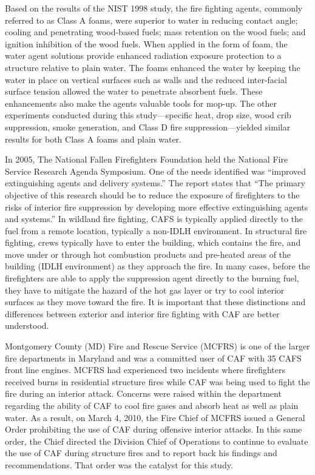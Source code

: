 \documentclass[12pt,oneside]{book}
\begin{document}
Based on the results of the NIST 1998 study, the fire fighting agents, commonly referred to as Class A foams, were superior to water in reducing contact angle; cooling and penetrating wood-based fuels; mass retention on the wood fuels; and ignition inhibition of the wood fuels.  When applied in the form of foam, the water agent solutions provide enhanced radiation exposure protection to a structure relative to plain water. The foams enhanced the water by keeping the water in place on vertical surfaces such as walls and the reduced inter-facial surface tension allowed the water to penetrate absorbent fuels. These enhancements also make the agents valuable tools for mop-up. The other experiments conducted during this study---specific heat, drop size, wood crib suppression, smoke generation, and Class D fire suppression---yielded similar results for both Class A foams and plain water.

In 2005, The National Fallen Firefighters Foundation held the National Fire Service Research Agenda Symposium.  One of the needs identified was ``improved extinguishing agents and delivery systems.'' The report states that ``The primary objective of this research should be to reduce the exposure of firefighters to the risks of interior fire suppression by developing more effective extinguishing agents and systems.'' In wildland fire fighting, CAFS is typically applied directly to the fuel from a remote location, typically a non-IDLH environment. In structural fire fighting, crews typically have to enter the building, which contains the fire, and move under or through hot combustion products and pre-heated areas of the building (IDLH environment) as they approach the fire. In many cases, before the firefighters are able to apply the suppression agent directly to the burning fuel, they have to mitigate the hazard of the hot gas layer or try to cool interior surfaces as they move toward the fire. It is important that these distinctions and differences between exterior and interior fire fighting with CAF are better understood.

Montgomery County (MD) Fire and Rescue Service (MCFRS) is one of the larger fire departments in Maryland and was a committed user of CAF with 35 CAFS front line engines. MCFRS had experienced two incidents where firefighters received burns in residential structure fires while CAF was being used to fight the fire during an interior attack. Concerns were raised within the department regarding the ability of CAF to cool fire gases and absorb heat as well as plain water. As a result, on March 4, 2010, the Fire Chief of MCFRS issued a General Order prohibiting the use of CAF during offensive interior attacks. In this same order, the Chief directed the Division Chief of Operations to continue to evaluate the use of CAF during structure fires and to report back his findings and recommendations. That order was the catalyst for this study.
\end{document}
